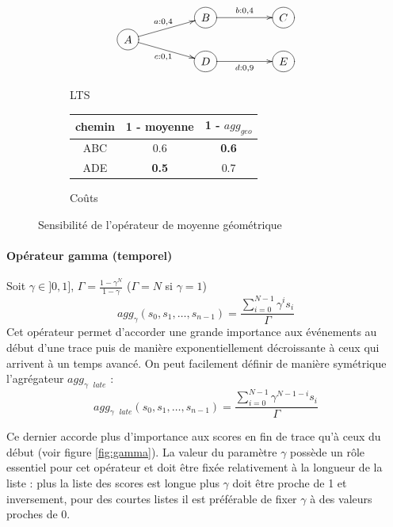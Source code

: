 \begin{figure}[h!]
    \centering
    \begin{subfigure}[b]{0.45\textwidth}
        \centering
        \[
        \xymatrix @R=0.1em@C=5em {
         & *++[o][F-]{B} \ar[r]^{b:0,4} & *++[o][F-]{C} \\
          *++[o][F-]{A} \ar[ru]^{a:0,4} \ar[rd]_{c:0,1} \\
        & *++[o][F-]{D} \ar[r]_{d:0,9} & *++[o][F-]{E}
        }
        \]
        \caption{LTS}
        \label{fig:lts_geo}
    \end{subfigure}
    \hfill
    \begin{subfigure}[b]{0.45\textwidth}
        \centering
        \begin{tabular}{ccc}
            chemin & 1 - moyenne & 1 - $agg_{geo}$ \\
            \hline
            ABC & 0.6 & \textbf{0.6} \\
            ADE & \textbf{0.5 }& 0.7 \\
        \end{tabular}
        \caption{Coûts}
    \end{subfigure}
    \caption{Sensibilité de l'opérateur de moyenne géométrique}
    \label{fig:geo}
\end{figure}
    
\paragraph{Opérateur gamma (temporel)}
Soit $\gamma\in ]0,1]$, $\Gamma = \frac{1-\gamma^{N}}{1-\gamma}$ ($\Gamma =N $ si $\gamma=1$)
    \begin{equation}
        agg_{\gamma}(s_0,s_1,\dots,s_{n-1}) = \frac{ \sum_{i=0}^{N-1}\gamma^is_i}{\Gamma}
    \end{equation}
    Cet opérateur permet d'accorder une grande importance aux événements au début d'une trace puis de manière exponentiellement décroissante à ceux qui arrivent à un temps avancé. On peut facilement définir de manière symétrique l'agrégateur $agg_{\gamma \text{ }late}$ :
    \begin{equation}
        agg_{\gamma \text{ }late}(s_0,s_1,\dots,s_{n-1}) = \frac{ \sum_{i=0}^{N-1}\gamma^{N-1-i}s_i}{\Gamma}        
    \end{equation}
    
    Ce dernier accorde plus d'importance aux scores en fin de trace qu'à ceux du début (voir figure \ref{fig:gamma}). La valeur du paramètre $\gamma$ possède un rôle essentiel pour cet opérateur et doit être fixée relativement à la longueur de la liste : plus la liste des scores est longue plus $\gamma$ doit être proche de 1 et inversement, pour des courtes listes il est préférable de fixer $\gamma$ à des valeurs proches de 0.
    
